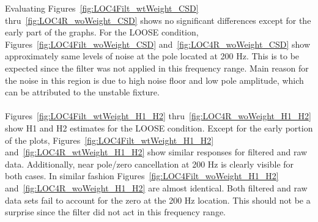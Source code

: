 \documentclass[paper=a4, fontsize=12pt]{scrartcl} %
\begin{document}
%
Evaluating Figures~\ref{fig:LOC4Filt_wtWeight_CSD} thru~\ref{fig:LOC4R_woWeight_CSD} shows no significant differences except for the early part of the graphs. For the LOOSE condition, Figures~\ref{fig:LOC4Filt_woWeight_CSD} and~\ref{fig:LOC4R_woWeight_CSD} show approximately same levels of noise at the pole located at 200 Hz. This is to be expected since the filter was not applied in this frequency range. Main reason for the noise in this region is due to high noise floor and low pole amplitude, which can be attributed to the unstable fixture.
\\
\\
Figures~\ref{fig:LOC4Filt_wtWeight_H1_H2} thru~\ref{fig:LOC4R_woWeight_H1_H2} show H1 and H2 estimates for the LOOSE condition. Except for the early portion of the plots, Figures~\ref{fig:LOC4Filt_wtWeight_H1_H2} and~\ref{fig:LOC4R_wtWeight_H1_H2} show similar responses for filtered and raw data. Additionally, near pole/zero cancellation at 200 Hz is clearly visible for both cases. In similar fashion Figures~\ref{fig:LOC4Filt_woWeight_H1_H2} and~\ref{fig:LOC4R_woWeight_H1_H2} are almost identical. Both filtered and raw data sets fail to account for the zero at the 200 Hz location. This should not be a surprise since the filter did not act in this frequency range.
%
\end{document}
